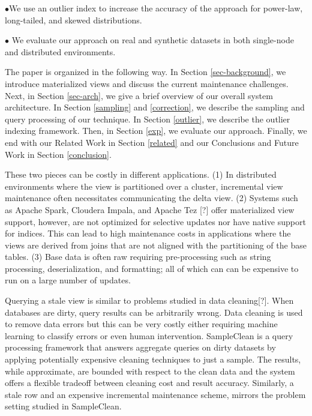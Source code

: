 \noindent $\bullet$We use an outlier index to increase the accuracy of the approach for power-law, long-tailed, and skewed distributions.\vspace{0.2em}

\noindent $\bullet$ We evaluate our approach on real and synthetic datasets in both single-node and distributed environments.\vspace{0.2em}

The paper is organized in the following way. 
In Section \ref{sec-background}, we introduce materialized views and discuss the current maintenance challenges.
Next, in Section \ref{sec-arch}, we give a brief overview of our overall system architecture.
In Section \ref{sampling} and \ref{correction}, we describe the sampling and query processing of our technique.
In Section \ref{outlier}, we describe the outlier indexing framework.
Then, in Section \ref{exp}, we evaluate our approach.
Finally, we end with our Related Work in Section \ref{related} and our Conclusions and Future Work in Section \ref{conclusion}.

\iffalse
 These two pieces can be costly in different
applications. (1) In distributed environments where the view is partitioned
over a cluster, incremental view maintenance often necessitates communicating
the delta view. (2) Systems such as Apache Spark, Cloudera Impala,
and Apache Tez {[}?{]} offer materialized view support, however, are
not optimized for selective updates nor have native support for indices.
This can lead to high maintenance costs in applications where the
views are derived from joins that are not aligned with the partitioning
of the base tables. (3) Base data is often raw requiring pre-processing
such as string processing, deserialization, and formatting; all of
which can can be expensive to run on a large number of updates. 



Querying a stale view is similar to problems studied in data cleaning{[}?{]}.
When databases are dirty, query results can be arbitrarily wrong.
Data cleaning is used to remove data errors but this can be very costly either 
requiring machine learning to classify errors or even human intervention.
SampleClean is a query processing framework that answers aggregate
queries on dirty datasets by applying potentially expensive cleaning
techniques to just a sample. The results, while approximate, are bounded
with respect to the clean data and the system offers a flexible tradeoff
between cleaning cost and result accuracy. Similarly, a stale row
and an expensive incremental maintenance scheme, mirrors the problem
setting studied in SampleClean. 

